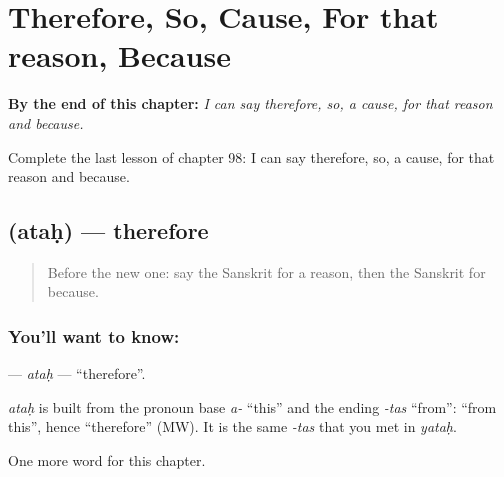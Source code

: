 
\chapter{Therefore, So, Cause, For that reason, Because}
\label{ch:sa-therefore-so-cause-for-that-reason-because}

\begin{chapteropening}
\textbf{By the end of this chapter:} \emph{I can say therefore, so, a cause, for that reason and because.}

Complete the last lesson of chapter 98: I can say therefore, so, a cause, for that reason and because.
\end{chapteropening}

\section[\texorpdfstring{\sk{अतः} (ataḥ)}{अतः (ataḥ)}]{ (ataḥ) — therefore}

\label{lesson:SA-C98-atah}



\begin{quote}
Before the new one: say the Sanskrit for a reason, then the Sanskrit for because.
\end{quote}

\subsection*{You'll want to know: }
\textbf{} — \emph{ataḥ} — \textquotedblleft{}therefore\textquotedblright{}.

\begin{cousinweb}
\emph{ataḥ} is built from the pronoun base \emph{a-} \textquotedblleft{}this\textquotedblright{} and the ending \emph{-tas} \textquotedblleft{}from\textquotedblright{}: \textquotedblleft{}from this\textquotedblright{}, hence \textquotedblleft{}therefore\textquotedblright{} (MW). It is the same \emph{-tas} that you met in \emph{yataḥ}.
\end{cousinweb}

\begin{grammarlens}[title={What you've built}]
One more word for this chapter.
\end{grammarlens}

